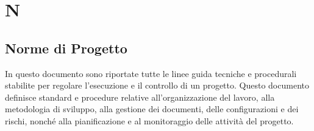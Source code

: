 \section{N}
\subsection{Norme di Progetto}
In questo documento sono riportate tutte le linee guida tecniche e procedurali
stabilite per regolare l'esecuzione e il controllo di un progetto. Questo
documento definisce standard e procedure relative all'organizzazione del
lavoro, alla metodologia di sviluppo, alla gestione dei documenti, delle
configurazioni e dei rischi, nonché alla pianificazione e al monitoraggio delle
attività del progetto.